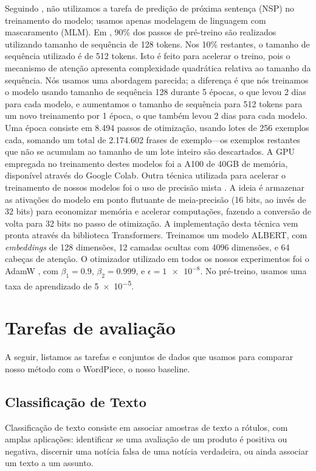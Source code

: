 \documentclass[cic,tc]{iiufrgs}
\begin{document}
Seguindo \citet{Liu2019RoBERTaAR}, não utilizamos a tarefa de predição de próxima sentença (NSP) no treinamento do modelo; usamos apenas modelagem de linguagem com mascaramento (MLM). Em \citet{devlin-etal-2019-bert}, 90\% dos passos de pré-treino são realizados utilizando tamanho de sequência de 128 tokens. Nos 10\% restantes, o tamanho de sequência utilizado é de 512 tokens. Isto é feito para acelerar o treino, pois o mecanismo de atenção apresenta complexidade quadrática relativa ao tamanho da sequência. Nós usamos uma abordagem parecida; a diferença é que nós treinamos o modelo usando tamanho de sequência 128 durante 5 épocas, o que levou 2 dias para cada modelo, e aumentamos o tamanho de sequência para 512 tokens para um novo treinamento por 1 época, o que também levou 2 dias para cada modelo. Uma época consiste em 8.494 passos de otimização, usando lotes de 256 exemplos cada, somando um total de 2.174.602 frases de exemplo---os exemplos restantes que não se acumulam ao tamanho de um lote inteiro são descartados. A GPU empregada no treinamento destes modelos foi a A100 de 40GB de memória, disponível através do Google Colab. Outra técnica utilizada para acelerar o treinamento de nossos modelos foi o uso de precisão mista \cite{micikevicius2018mixed}. A ideia é armazenar as ativações do modelo em ponto flutuante de meia-precisão (16 bits, ao invés de 32 bits) para economizar memória e acelerar computações, fazendo a conversão de volta para 32 bits no passo de otimização. A implementação desta técnica vem pronta através da biblioteca Transformers. Treinamos um modelo ALBERT, com \emph{embeddings} de 128 dimensões, 12 camadas ocultas com 4096 dimensões, e 64 cabeças de atenção. O otimizador utilizado em todos os nossos experimentos foi o AdamW \cite{loshchilov2018decoupled}, com $\beta_1 = 0.9$, $\beta_2 = 0.999$, e $\epsilon = \num{1e-8}$. No pré-treino, usamos uma taxa de aprendizado de \num{5e-5}.

\section{Tarefas de avaliação}
A seguir, listamos as tarefas e conjuntos de dados que usamos para comparar nosso método com o WordPiece, o nosso baseline.

\subsection{Classificação de Texto}
Classificação de texto consiste em associar amostras de texto a rótulos, com amplas aplicações: identificar se uma avaliação de um produto é positiva ou negativa, discernir uma notícia falsa de uma notícia verdadeira, ou ainda associar um texto a um assunto.
\end{document}
